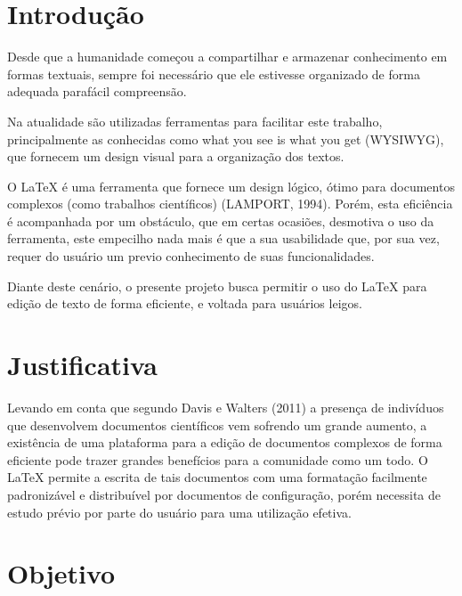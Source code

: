 \documentclass[article,12pt,oneside,a4paper,english,brazil,sumario=tradicional]{abntex2}
\begin{document}
\textual
\pagestyle{simple}

\section{Introdução}
\label{secIntroducao}
\normalsize

Desde que a humanidade começou a compartilhar e armazenar conhecimento em formas textuais, sempre foi necessário que ele estivesse organizado de forma adequada parafácil compreensão. 

Na atualidade são utilizadas ferramentas para facilitar este trabalho, principalmente as conhecidas como what you see is what you get (WYSIWYG), que fornecem um design visual para a organização dos textos.

O LaTeX é uma ferramenta que fornece um design lógico, ótimo para documentos complexos (como trabalhos científicos) (LAMPORT, 1994). Porém, esta eficiência é acompanhada por um obstáculo, que em certas ocasiões, desmotiva o uso da ferramenta, este empecilho nada mais é que a sua usabilidade que, por sua vez, requer do usuário um previo conhecimento de suas funcionalidades.

Diante deste cenário, o presente projeto busca permitir o uso do LaTeX para edição de texto de forma eficiente, e voltada para usuários leigos.





\section{Justificativa}

Levando em conta que segundo Davis e Walters (2011) a presença de indivíduos que desenvolvem documentos científicos vem sofrendo um grande aumento, a existência de uma plataforma para a edição de documentos complexos de forma eficiente pode trazer grandes benefícios para a comunidade como um todo. O LaTeX permite a escrita de tais documentos com uma formatação facilmente padronizável e distribuível por documentos de configuração, porém necessita de estudo prévio por parte do usuário para uma utilização efetiva.





\section{Objetivo}
\end{document}
